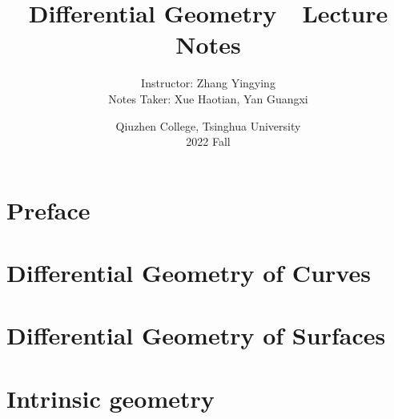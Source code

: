 \documentclass[oneside,12pt]{book}
\title{
    \huge{Differential Geometry~~Lecture Notes}
    \vspace{0.4\paperheight}
}
\author{
    \Large{Instructor: Zhang Yingying}\\
    \Large{Notes Taker: Xue Haotian, Yan Guangxi}
    \vspace{0.1\paperheight}
}
\date{
    \Large{Qiuzhen College, Tsinghua University}\\
    \Large{2022 Fall}
}
\theoremstyle{plain}\newtheorem{theorem}{Theorem}
\theoremstyle{definition}\newtheorem{definition}[theorem]{Definition}
\theoremstyle{plain}\newtheorem{axiom}[theorem]{Axiom}
\theoremstyle{plain}\newtheorem{corollary}[theorem]{Corollary}
\theoremstyle{plain}\newtheorem{lemma}[theorem]{Lemma}
\theoremstyle{plain}\newtheorem{proposition}[theorem]{Proposition}
\theoremstyle{plain}\newtheorem{prop}[theorem]{Proposition}
\theoremstyle{plain}\newtheorem{conjecture}[theorem]{Conjecture}
\theoremstyle{plain}\newtheorem{problem}[theorem]{Problem}
\theoremstyle{plain}\newtheorem{example}[theorem]{Example}
\theoremstyle{plain}\newtheorem{construction}[theorem]{Construction}
\theoremstyle{remark}\newtheorem{notation}[theorem]{Notation}
\theoremstyle{definition}\newtheorem*{question}{Question}
\theoremstyle{definition}\newtheorem*{answer}{Answer}
\theoremstyle{definition}\newtheorem*{goal}{Goal}
\theoremstyle{plain}\newtheorem*{application}{Application}
\theoremstyle{plain}\newtheorem*{exercise}{Exercise}
\theoremstyle{remark}\newtheorem*{remark}{Remark}
\theoremstyle{remark}\newtheorem*{note}{\small{Note}}
\numberwithin{equation}{section}
\numberwithin{theorem}{section}
\numberwithin{figure}{section}
\begin{document}
\maketitle
\frontmatter
\tableofcontents
\newpage


\mainmatter{}

\chapter*{\centering Preface}


\chapter{Differential Geometry of Curves}




\chapter{Differential Geometry of Surfaces}







\chapter{Intrinsic geometry}






\end{document}
